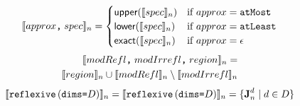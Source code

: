 \begin{equation*}
  \interp{approx\texttt{,} \; spec}_n =
    \begin{cases}
      \textsf{upper}(\interp{spec}_n) &\mbox{if } {approx} = \texttt{atMost} \\
      \textsf{lower}(\interp{spec}_n) &\mbox{if } {approx} = \texttt{atLeast} \\
      \textsf{exact}(\interp{spec}_n) &\mbox{if } {approx} = \epsilon \\
    \end{cases}
\end{equation*}
\begin{equation*}
\begin{split}
  \interp{modRefl\texttt{,} \; modIrrefl\texttt{,} \; region}_n = \\
  \interp{region}_n \cup \interp{modRefl}_n \setminus \interp{modIrrefl}_n
\end{split}
\end{equation*}
\begin{align*}
  \interp{\texttt{reflexive} \, (\texttt{dims=}D)}_n =
  \interp{\texttt{reflexive} \, (\texttt{dims=}D)}_n =
    \{\singleEntry{d}{n} \mid d \in D \} \\
\end{align*}

